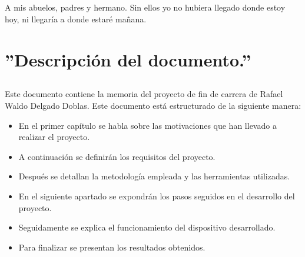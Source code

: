 \documentclass[a4paper,12pt,titlepage,final]{book}
\begin{document}
\maketitle

\newpage
\thispagestyle{empty}
\section*{}
\paragraph{}
A mis abuelos, padres y hermano. \newline
Sin ellos yo no hubiera llegado donde\newline
estoy hoy, ni llegaría a donde estaré\newline
mañana.

\tableofcontents

\mainmatter
\chapter{''Descripción del documento.''}
\section*{}
\subsection*{}
\subsubsection*{}

\paragraph{}
Este documento contiene la memoria del proyecto de fin de carrera de Rafael Waldo Delgado Doblas. Este documento está estructurado de la siguiente manera:

\begin{itemize}
  \item En el primer capítulo se habla sobre las motivaciones que han llevado a realizar el proyecto.
  \item A continuación se definirán los requisitos del proyecto.
  \item Después se detallan la metodología empleada y las herramientas utilizadas.
  \item En el siguiente apartado se expondrán los pasos seguidos en el desarrollo del proyecto.
  \item Seguidamente se explica el funcionamiento del dispositivo desarrollado.
  \item Para finalizar se presentan los resultados obtenidos.
\end{itemize}
\end{document}
